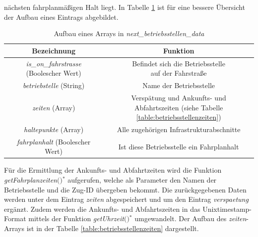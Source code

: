 nächsten fahrplanmäßigen Halt liegt. In Tabelle \ref{table:betriebsstellen} ist für eine bessere Übersicht der Aufbau eines Eintrags abgebildet.
\begin{table}
\begin{center}
\renewcommand{\arraystretch}{1.2}
\begin{tabular}{c|c}
Bezeichnung & Funktion \\ \hline
\textit{is\_on\_fahrstrasse} (Boolescher Wert)                  		&    \makecell{Befindet sich die Betriebsstelle\\auf der Fahrstraße}                  \\ \hline
\textit{betriebstelle} (String)                  		&    Name der Betriebsstelle                  \\ \hline
\textit{zeiten} (Array)                  		&    \makecell{Verspätung und Ankunfts- und\\Abfahrtszeiten (siehe Tabelle \ref{table:betriebsstellenzeiten})}                  \\ \hline
\textit{haltepunkte} (Array)                  		&    Alle zugehörigen Infrastrukturabschnitte                 \\ \hline
\textit{fahrplanhalt} (Boolescher Wert)             	&    Ist diese Betriebsstelle ein Fahrplanhalt               \\ 
\end{tabular}
\renewcommand{\arraystretch}{1}
\caption{Aufbau eines Arrays in \textit{next\_betriebsstellen\_data}}
\label{table:betriebsstellen}
\end{center}
\end{table}
Für die Ermittlung der Ankunfts- und Abfahrtzeiten wird die Funktion \textit{getFahrplanzeiten$($$)$}$^\ast$ aufgerufen, welche als Parameter den Namen der Betriebsstelle und die Zug-ID übergeben bekommt. Die zurückgegebenen Daten werden unter dem Eintrag \textit{zeiten} abgespeichert und um den Eintrag \textit{verspaetung} ergänzt. Zudem werden die Ankunfts- und Abfahrtszeiten in das Unixtimestamp-Format mittels der Funktion \textit{getUhrzeit$($$)$}$^\ast$ umgewandelt. Der Aufbau des \textit{zeiten}-Arrays ist in der Tabelle \ref{table:betriebsstellenzeiten} dargestellt.
